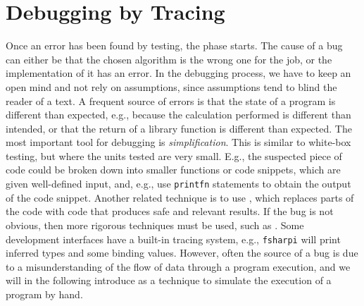 \begin{comment}
  http://www.scientificamerican.com/article/pogue-5-most-embarrassing-software-bugs-in-history/, 5 Most Embarrassing Software Bugs in History

  http://royal.pingdom.com/2009/03/19/10-historical-software-bugs-with-extreme-consequences/

  https://raygun.com/blog/2014/05/10-costly-software-errors-history/

  http://www.computerworld.com/article/2515483/enterprise-applications/epic-failures--11-infamous-software-bugs.html

  http://catless.ncl.ac.uk/Risks/20.59.html#subj1

  https://en.wikipedia.org/wiki/List_of_software_bugs

  December 19, 1991; ISO/IEC 9126, the international standard for the evaluation of software quality, replaced by ISO/IEC 25010:2011. Not publicly available, \footnote{A review of the ISO/IEC 9126 is given in \url{http://www.sqa.net/iso9126.html}. A brief review of ISO/IEC 25010:2011 is given in }
\end{comment}

\section{Debugging by Tracing}
Once an error has been found by testing, the  phase starts. The cause of a bug can either be that the chosen algorithm is the wrong one for the job, or the implementation of it has an error. In the debugging process, we have to keep an open mind and not rely on assumptions, since assumptions tend to blind the reader of a text. A frequent source of errors is that the state of a program is different than expected, e.g., because the calculation performed is different than intended, or that the return of a library function is different than expected. The most important tool for debugging is \emph{simplification}. This is similar to white-box testing, but where the units tested are very small. E.g., the suspected piece of code could be broken down into smaller functions or code snippets, which are given well-defined input, and, e.g., use \lstinline!printfn! statements to obtain the output of the code snippet. Another related technique is to use , which replaces parts of the code with code that produces safe and relevant results. If the bug is not obvious, then more rigorous techniques must be used, such as . Some development interfaces have a built-in tracing system, e.g., \lstinline[language=console]{fsharpi} will print inferred types and some binding values. However, often the source of a bug is due to a misunderstanding of the flow of data through a program execution, and we will in the following introduce  as a technique to simulate the execution of a program by hand.


